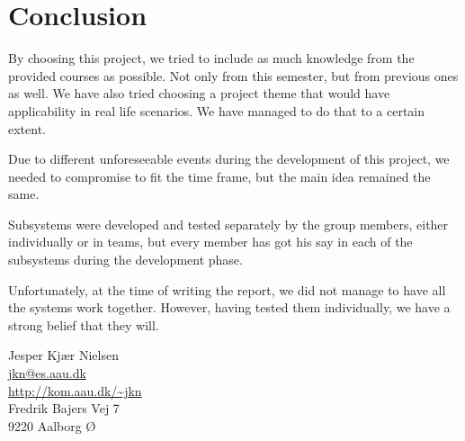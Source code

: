 \chapter{Conclusion}\label{ch:conclusion}

By choosing this project, we tried to include as much knowledge from the provided 
courses as possible. Not only from this semester, but from previous ones as well.
We have also tried choosing a project theme that would have applicability in real 
life scenarios.
We have managed to do that to a certain extent. 

Due to different unforeseeable events during the development of this project, we 
needed to compromise to fit the time frame, but the main idea 
remained the same. 

Subsystems were developed and tested separately by the group members, either 
individually or in teams, but every member has got his say in each of the 
subsystems during the development phase.

Unfortunately, at the time of writing the report, we did not manage to have all the 
systems work together. However, having tested them individually, we have a strong 
belief that they will.



  \begin{center}
    Jesper Kjær Nielsen\\
    \href{mailto: jkn@es.aau.dk}{jkn@es.aau.dk}\\
    \href{http://kom.aau.dk/~jkn}{http://kom.aau.dk/\textasciitilde jkn}\\
    Fredrik Bajers Vej 7\\
    9220 Aalborg Ø
  \end{center}